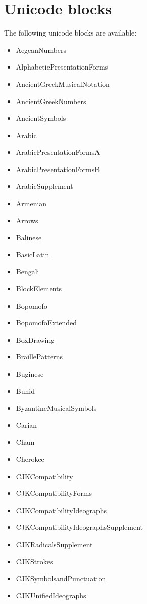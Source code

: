 \documentclass{article}
\newenvironment{itemlist}{%
  \begin{itemize}
	\setlength{\itemsep}{0pt}
	\setlength{\parsep}{0pt}
	\setlength{\topsep}{0pt}
	\setlength{\partopsep}{0pt}
	\setlength{\parskip}{0pt}
	\setlength{\labelsep}{5pt}}%
{
  \end{itemize}}
\begin{document}
	\section{Unicode blocks}
	
		The following unicode blocks are available:
		
		\begin{multicols}{2}
			\begin{itemlist}
				\item AegeanNumbers
				\item AlphabeticPresentationForms
				\item AncientGreekMusicalNotation
				\item AncientGreekNumbers
				\item AncientSymbols
				\item Arabic
				\item ArabicPresentationFormsA
				\item ArabicPresentationFormsB
				\item ArabicSupplement
				\item Armenian
				\item Arrows
				\item Balinese
				\item BasicLatin
				\item Bengali
				\item BlockElements
				\item Bopomofo
				\item BopomofoExtended
				\item BoxDrawing
				\item BraillePatterns
				\item Buginese
				\item Buhid
				\item ByzantineMusicalSymbols
				\item Carian
				\item Cham
				\item Cherokee
				\item CJKCompatibility
				\item CJKCompatibilityForms
				\item CJKCompatibilityIdeographs
				\item CJKCompatibilityIdeographsSupplement
				\item CJKRadicalsSupplement
				\item CJKStrokes
				\item CJKSymbolsandPunctuation
				\item CJKUnifiedIdeographs

\end{itemlist}
\end{multicols}
\end{document}
